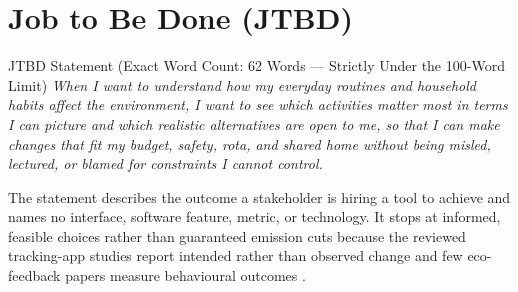 \documentclass[12pt, a4paper]{article}
\begin{document}
\section{Job to Be Done (JTBD)}

\begin{jtbdbox}{JTBD Statement (Exact Word Count: 62 Words --- Strictly Under the 100-Word Limit)}
\textit{When I want to understand how my everyday routines and household habits affect the environment, I want to see which activities matter most in terms I can picture and which realistic alternatives are open to me, so that I can make changes that fit my budget, safety, rota, and shared home without being misled, lectured, or blamed for constraints I cannot control.}
\end{jtbdbox}

The statement describes the outcome a stakeholder is hiring a tool to achieve and names no interface, software feature, metric, or technology. It stops at informed, feasible choices rather than guaranteed emission cuts because the reviewed tracking-app studies report intended rather than observed change \cite{hoffmann2024,lasarov2024} and few eco-feedback papers measure behavioural outcomes \cite{froehlich2010}.
\end{document}
